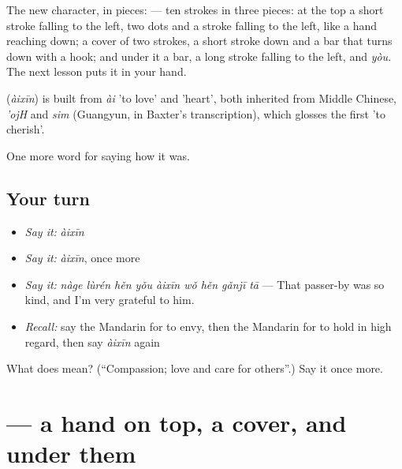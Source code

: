 The new character, in pieces:  — ten strokes in three pieces: at the top a short stroke falling to the left, two dots and a stroke falling to the left, like a hand reaching down; a cover of two strokes, a short stroke down and a bar that turns down with a hook; and under it a bar, a long stroke falling to the left, and  \emph{yòu}. The next lesson puts it in your hand.

\begin{cousinweb}
\textbf{} (\emph{àixīn}) is built from \emph{ài} 'to love' and  'heart', both inherited from Middle Chinese, \emph{'ojH} and \emph{sim} (Guangyun, in Baxter's transcription), which glosses the first 'to cherish'.
\end{cousinweb}

\begin{grammarlens}[title={What you've built}]
One more word for saying how it was.
\end{grammarlens}

\subsection*{Your turn}
\begin{itemize}
\raggedright
  \item \emph{Say it:} \emph{àixīn}
  \item \emph{Say it:} \emph{àixīn}, once more
  \item \emph{Say it:} \emph{nàge lùrén hěn yǒu àixīn wǒ hěn gǎnjī tā} — That passer-by was so kind, and I'm very grateful to him.
  \item \emph{Recall:} say the Mandarin for to envy, then the Mandarin for to hold in high regard, then say \emph{àixīn} again
\end{itemize}

\begin{tcolorbox}[breakable,colback=teal!4,colframe=teal!35!black,title={Before you move on}]
What does  mean? (\textquotedblleft{}Compassion; love and care for others\textquotedblright{}.) Say it once more.
\end{tcolorbox}
\section[\texorpdfstring{\zh{爱} (ài)}{爱 (ài)}]{ — a hand on top, a cover, and  under them}

\label{lesson:ZH-W461-ai-love}



